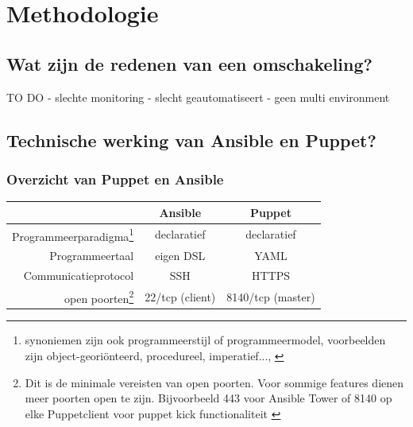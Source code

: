 
\chapter{Methodologie}
\label{ch:methodologie}


\section{Wat zijn de redenen van een omschakeling?}
\label{sec:methodologie-redenen-omschakeling}

TO DO
- slechte monitoring
- slecht geautomatiseert 
- geen multi environment

\section{Technische werking van Ansible en Puppet?}
\label{sec:methodologie-technische-verschillen}

\subsection{Overzicht van Puppet en Ansible}


\begin{tabular}{ r |c c }
&Ansible & Puppet \\
  \hline	  		
Programmeerparadigma\footnote{synoniemen zijn ook programmeerstijl of programmeermodel, voorbeelden zijn object-geori\"onteerd, procedureel, imperatief..., \autocite{journalofinformation} }  & declaratief & declaratief  \\
   \hline
 Programmeertaal &eigen DSL & YAML \\
     \hline
   Communicatieprotocol & SSH & HTTPS \\
   \hline
   open poorten\footnote{Dit is de minimale vereisten van open poorten. Voor sommige features dienen meer poorten open te zijn. Bijvoorbeeld 443 voor Ansible Tower of 8140 op elke Puppetclient voor puppet kick functionaliteit \autocite{puppetkick} }  & 22/tcp (client) & 8140/tcp (master)\\
   
  

  \end{tabular}



